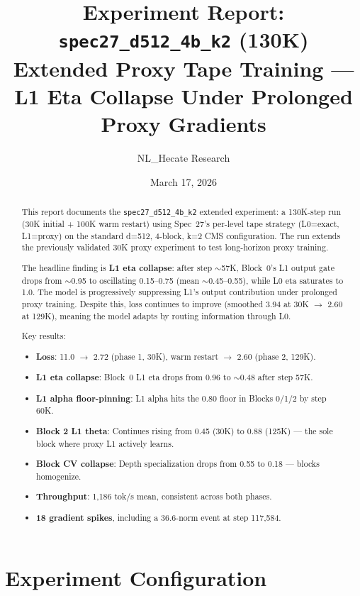 \documentclass[11pt,a4paper]{article}
\title{Experiment Report: \texttt{spec27\_d512\_4b\_k2} (130K)\\[0.3em]
\large Extended Proxy Tape Training --- L1 Eta Collapse Under Prolonged Proxy Gradients}
\author{NL\_Hecate Research}
\date{March 17, 2026}
\begin{document}
\maketitle

\begin{abstract}
This report documents the \texttt{spec27\_d512\_4b\_k2} extended experiment: a 130K-step run
(30K initial + 100K warm restart) using Spec~27's per-level tape strategy (L0=exact, L1=proxy)
on the standard d=512, 4-block, k=2 CMS configuration. The run extends the previously validated
30K proxy experiment to test long-horizon proxy training.

The headline finding is \textbf{L1 eta collapse}: after step $\sim$57K, Block~0's L1 output gate
drops from $\sim$0.95 to oscillating 0.15--0.75 (mean $\sim$0.45--0.55), while L0 eta saturates
to 1.0. The model is progressively suppressing L1's output contribution under prolonged proxy training.
Despite this, loss continues to improve (smoothed 3.94 at 30K $\to$ 2.60 at 129K), meaning the model
adapts by routing information through L0.

Key results:
\begin{itemize}
    \item \textbf{Loss}: 11.0 $\to$ 2.72 (phase 1, 30K), warm restart $\to$ 2.60 (phase 2, 129K).
    \item \textbf{L1 eta collapse}: Block~0 L1 eta drops from 0.96 to $\sim$0.48 after step 57K.
    \item \textbf{L1 alpha floor-pinning}: L1 alpha hits the 0.80 floor in Blocks 0/1/2 by step 60K.
    \item \textbf{Block 2 L1 theta}: Continues rising from 0.45 (30K) to 0.88 (125K) --- the sole block where proxy L1 actively learns.
    \item \textbf{Block CV collapse}: Depth specialization drops from 0.55 to 0.18 --- blocks homogenize.
    \item \textbf{Throughput}: 1,186 tok/s mean, consistent across both phases.
    \item \textbf{18 gradient spikes}, including a 36.6-norm event at step 117,584.
\end{itemize}
\end{abstract}

\tableofcontents
\newpage

\section{Experiment Configuration}
\end{document}
